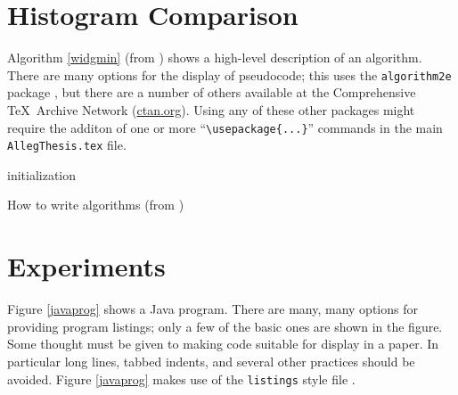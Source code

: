 \section{Histogram Comparison}
Algorithm \ref{widgmin} (from ) shows a high-level description of an
algorithm. There are many options for the display of
pseudocode; this uses the {\tt algorithm2e} package , 
but there are a number of others available at the Comprehensive \TeX\ Archive
Network (\url{ctan.org}). Using any of these
other packages might require the additon of one or more
``\verb$\usepackage{...}$'' commands in the main {\tt AllegThesis.tex} file.


\begin{algorithm}[htbp]
 \SetAlgoLined %
 initialization\;
 \caption{How to write algorithms (from )}
\label{widgmin}
\end{algorithm}

\section{Experiments}

Figure \ref{javaprog} shows a Java program. There are many, many options for
providing program listings; only a few of the basic ones are shown
in the figure. Some thought must be given to making code suitable
for display in a paper. In particular long lines, tabbed indents, and
several other practices should be avoided. Figure \ref{javaprog} makes
use of the {\tt listings} style file .

